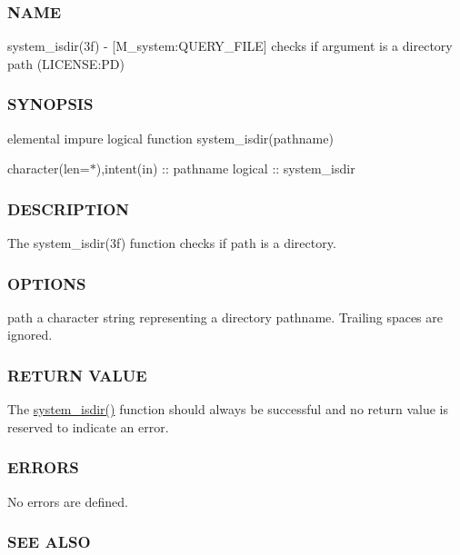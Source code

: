 \subsubsection*{N\+A\+ME}

system\+\_\+isdir(3f) -\/ \mbox{[}M\+\_\+system\+:Q\+U\+E\+R\+Y\+\_\+\+F\+I\+LE\mbox{]} checks if argument is a directory path (L\+I\+C\+E\+N\+SE\+:PD) 

\subsubsection*{S\+Y\+N\+O\+P\+S\+IS}

elemental impure logical function system\+\_\+isdir(pathname)

character(len=$\ast$),intent(in) \+:\+: pathname logical \+:\+: system\+\_\+isdir

\subsubsection*{D\+E\+S\+C\+R\+I\+P\+T\+I\+ON}

The system\+\_\+isdir(3f) function checks if path is a directory.

\subsubsection*{O\+P\+T\+I\+O\+NS}

path a character string representing a directory pathname. Trailing spaces are ignored.

\subsubsection*{R\+E\+T\+U\+RN V\+A\+L\+UE}

The \mbox{\hyperlink{namespacem__system_a7946ea976f399baff21caebcbe931f6d}{system\+\_\+isdir()}} function should always be successful and no return value is reserved to indicate an error.

\subsubsection*{E\+R\+R\+O\+RS}

No errors are defined.

\subsubsection*{S\+EE A\+L\+SO}


